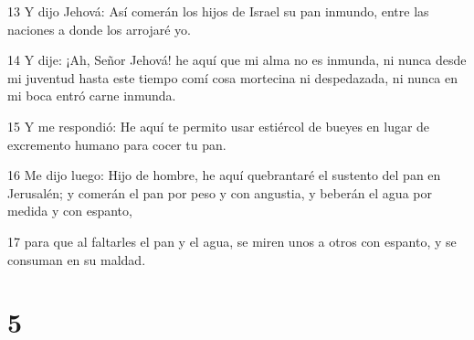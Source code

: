 \par 13 Y dijo Jehová: Así comerán los hijos de Israel su pan inmundo, entre las naciones a donde los arrojaré yo.
\par 14 Y dije: ¡Ah, Señor Jehová! he aquí que mi alma no es inmunda, ni nunca desde mi juventud hasta este tiempo comí cosa mortecina ni despedazada, ni nunca en mi boca entró carne inmunda.
\par 15 Y me respondió: He aquí te permito usar estiércol de bueyes en lugar de excremento humano para cocer tu pan.
\par 16 Me dijo luego: Hijo de hombre, he aquí quebrantaré el sustento del pan en Jerusalén; y comerán el pan por peso y con angustia, y beberán el agua por medida y con espanto,
\par 17 para que al faltarles el pan y el agua, se miren unos a otros con espanto, y se consuman en su maldad.

\chapter{5}

